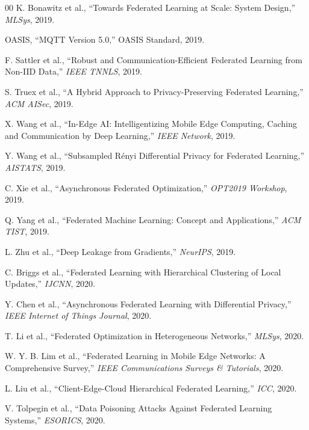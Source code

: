 \documentclass[conference]{IEEEtran}
\begin{document}
\begin{thebibliography}{00}
 K. Bonawitz et al., ``Towards Federated Learning at Scale: System Design,'' \textit{MLSys}, 2019.

 OASIS, ``MQTT Version 5.0,'' OASIS Standard, 2019.

 F. Sattler et al., ``Robust and Communication-Efficient Federated Learning from Non-IID Data,'' \textit{IEEE TNNLS}, 2019.

 S. Truex et al., ``A Hybrid Approach to Privacy-Preserving Federated Learning,'' \textit{ACM AISec}, 2019.

 X. Wang et al., ``In-Edge AI: Intelligentizing Mobile Edge Computing, Caching and Communication by Deep Learning,'' \textit{IEEE Network}, 2019.


 Y. Wang et al., ``Subsampled R\'enyi Differential Privacy for Federated Learning,'' \textit{AISTATS}, 2019.

 C. Xie et al., ``Asynchronous Federated Optimization,'' \textit{OPT2019 Workshop}, 2019.

 Q. Yang et al., ``Federated Machine Learning: Concept and Applications,'' \textit{ACM TIST}, 2019.

 L. Zhu et al., ``Deep Leakage from Gradients,'' \textit{NeurIPS}, 2019.

 C. Briggs et al., ``Federated Learning with Hierarchical Clustering of Local Updates,'' \textit{IJCNN}, 2020.

 Y. Chen et al., ``Asynchronous Federated Learning with Differential Privacy,'' \textit{IEEE Internet of Things Journal}, 2020.


 T. Li et al., ``Federated Optimization in Heterogeneous Networks,'' \textit{MLSys}, 2020.

 W. Y. B. Lim et al., ``Federated Learning in Mobile Edge Networks: A Comprehensive Survey,'' \textit{IEEE Communications Surveys \& Tutorials}, 2020.

 L. Liu et al., ``Client-Edge-Cloud Hierarchical Federated Learning,'' \textit{ICC}, 2020.

 V. Tolpegin et al., ``Data Poisoning Attacks Against Federated Learning Systems,'' \textit{ESORICS}, 2020.


\end{thebibliography}
\end{document}
